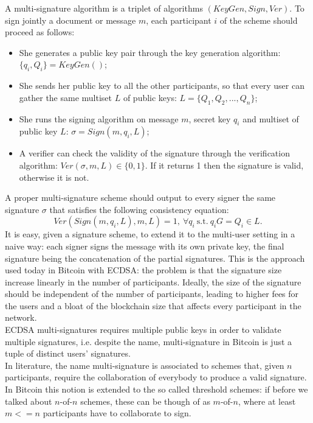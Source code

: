 \bigskip
\noindent
A multi-signature algorithm is a triplet of algorithms $(KeyGen, Sign, Ver)$. To sign jointly a document or message $m$, each participant $i$ of the scheme should proceed as follows:
\begin{itemize}
	\item She generates a public key pair through the key generation algorithm: $\{q_i, Q_i\} = KeyGen()$;
	\item She sends her public key to all the other participants, so that every user can gather the same multiset $L$ of public keys: $L = \{Q_1, Q_2, ..., Q_n\}$;
	\item She runs the signing algorithm on message $m$, secret key $q_i$ and multiset of public key $L$: $\sigma = Sign(m, q_i, L)$;
	\item A verifier can check the validity of the signature through the verification algorithm: $Ver(\sigma, m, L) \in \{0, 1\}$. If it returns 1 then the signature is valid, otherwise it is not.
\end{itemize}
A proper multi-signature scheme should output to every signer the same signature $\sigma$ that satisfies the following consistency equation: 
$$Ver(Sign(m, q_i, L), m, L) = 1, \ \forall q_i \ \text{s.t.} \ q_iG = Q_i \in L.$$
It is easy, given a signature scheme, to extend it to the multi-user setting in a naive way: each signer signs the message with its own private key, the final signature being the concatenation of the partial signatures. This is the approach used today in Bitcoin with ECDSA: the problem is that the signature size increase linearly in the number of participants. Ideally, the size of the signature should be independent of the number of participants, leading to higher fees for the users and a bloat of the blockchain size that affects every participant in the network.
\\
ECDSA multi-signatures requires multiple public keys in order to validate multiple signatures, i.e. despite the name, multi-signature in Bitcoin is just a tuple of distinct users' signatures.
\\
In literature, the name multi-signature is associated to schemes that, given $n$ participants, require the collaboration of everybody to produce a valid signature. In Bitcoin this notion is extended to the so called threshold schemes: if before we talked about $n$-of-$n$ schemes, these can be though of as $m$-of-$n$, where at least $m <= n$ participants have to collaborate to sign.

\bigskip


